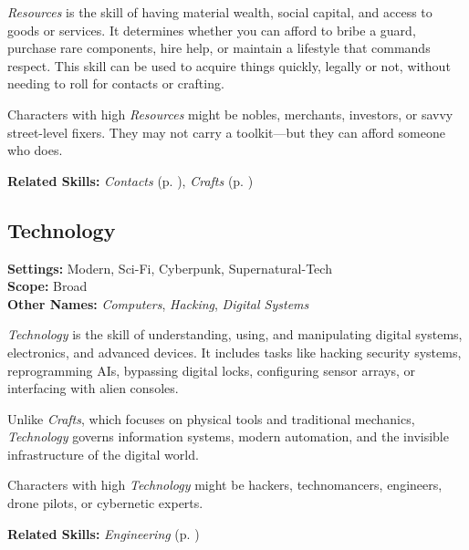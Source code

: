 \emph{Resources} is the skill of having material wealth, social capital, and access to goods or services. It determines whether you can afford to bribe a guard, purchase rare components, hire help, or maintain a lifestyle that commands respect. This skill can be used to acquire things quickly, legally or not, without needing to roll for contacts or crafting.

Characters with high \emph{Resources} might be nobles, merchants, investors, or savvy street-level fixers. They may not carry a toolkit—but they can afford someone who does.

\vspace{0.5\baselineskip}
\noindent\textbf{Related Skills:} \emph{Contacts} (p. \pageref{skill:contacts}), \emph{Crafts} (p. \pageref{skill:crafts})



\subsection{Technology}\label{skill:technology}
\textbf{Settings:} Modern, Sci-Fi, Cyberpunk, Supernatural-Tech\\
\textbf{Scope:} Broad\\
\textbf{Other Names:} \emph{Computers}, \emph{Hacking}, \emph{Digital Systems}\\
\vspace{\baselineskip}

\emph{Technology} is the skill of understanding, using, and manipulating digital systems, electronics, and advanced devices. It includes tasks like hacking security systems, reprogramming AIs, bypassing digital locks, configuring sensor arrays, or interfacing with alien consoles.

Unlike \emph{Crafts}, which focuses on physical tools and traditional mechanics, \emph{Technology} governs information systems, modern automation, and the invisible infrastructure of the digital world.

Characters with high \emph{Technology} might be hackers, technomancers, engineers, drone pilots, or cybernetic experts.

\vspace{0.5\baselineskip}
\noindent\textbf{Related Skills:} \emph{Engineering} (p. \pageref{skill:engineering})